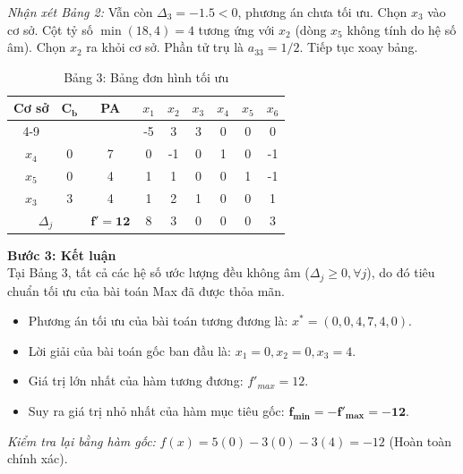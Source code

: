 \textit{Nhận xét Bảng 2:} Vẫn còn $\Delta_3 = -1.5 < 0$, phương án chưa tối ưu. Chọn $x_3$ vào cơ sở. Cột tỷ số $\min(18, 4) = 4$ tương ứng với $x_2$ (dòng $x_5$ không tính do hệ số âm). Chọn $x_2$ ra khỏi cơ sở. Phần tử trụ là $a_{33} = 1/2$. Tiếp tục xoay bảng.

\begin{table}[htbp]
    \centering
    \renewcommand{\arraystretch}{1.3}
    \begin{tabular}{|c|c|c|c|c|c|c|c|c|}
        \hline
        \multirow{2}{*}{\textbf{Cơ sở}} & \multirow{2}{*}{$\mathbf{C_b}$} & \multirow{2}{*}{\textbf{PA}} & $x_1$ & $x_2$ & $x_3$ & $x_4$ & $x_5$ & $x_6$ \\
        \cline{4-9}
        & & & -5 & 3 & 3 & 0 & 0 & 0 \\
        \hline
        $x_4$ & 0 & 7 & 0 & -1 & 0 & 1 & 0 & -1 \\
        \hline
        $x_5$ & 0 & 4 & 1 & 1 & 0 & 0 & 1 & -1 \\
        \hline
        $x_3$ & 3 & 4 & 1 & 2 & 1 & 0 & 0 & 1 \\
        \hline
        \multicolumn{2}{|c|}{$\Delta_j$} & $\mathbf{f' = 12}$ & 8 & 3 & 0 & 0 & 0 & 3 \\
        \hline
    \end{tabular}
    \caption{Bảng 3: Bảng đơn hình tối ưu}
\end{table}

\textbf{Bước 3: Kết luận} \\
Tại Bảng 3, tất cả các hệ số ước lượng đều không âm ($\Delta_j \ge 0, \forall j$), do đó tiêu chuẩn tối ưu của bài toán Max đã được thỏa mãn. 
\begin{itemize}
    \item Phương án tối ưu của bài toán tương đương là: $x^* = (0, 0, 4, 7, 4, 0)$.
    \item Lời giải của bài toán gốc ban đầu là: $x_1 = 0, x_2 = 0, x_3 = 4$.
    \item Giá trị lớn nhất của hàm tương đương: $f'_{max} = 12$.
    \item Suy ra giá trị nhỏ nhất của hàm mục tiêu gốc: $\mathbf{f_{min} = -f'_{max} = -12}$.
\end{itemize}
\textit{Kiểm tra lại bằng hàm gốc:} $f(x) = 5(0) - 3(0) - 3(4) = -12$ (Hoàn toàn chính xác).
